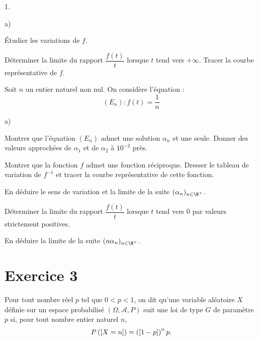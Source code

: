\documentclass[11pt]{article}%
\begin{document}
\begin{noliste}{1.}
 \setlength{\itemsep}{4mm}
\item 

\begin{noliste}{a)}
 \setlength{\itemsep}{2mm}
\item Étudier les variations de $f$.

\item Déterminer la limite du rapport $\dfrac{f(t)}{t}$ lorsque $t$
tend
vers $ + \infty $. Tracer la courbe représentative de $f$.
\end{noliste}

\item Soit $n$ un entier naturel non nul. On considère l'équation : 
\[
(E_{n}) :f(t) = \frac{1}{n}
\]

\begin{noliste}{a)}
 \setlength{\itemsep}{2mm}
\item Montrer que l'équation $(E_{n})$ admet une solution $\alpha_{n}$
et
une seule. Donner des valeurs approchées de $\alpha_{1}$ et de
$\alpha_{2}$
à $10^{-2}$ près.

\item Montrer que la fonction $f$ admet une fonction réciproque.
Dresser le
tableau de variation de $f^{-1}$ et tracer la courbe représentative de
cette
fonction.

En déduire le sens de variation et la limite de la suite $(\alpha
_{n})_{n\in \N^{\times }}$.

\item Déterminer la limite du rapport $\dfrac{f(t)}{t}$ lorsque $t$
tend
vers $0$ par valeurs strictement positives.

En déduire la limite de la suite $(n\alpha_{n})_{n\in \N^{\times }}$.
\end{noliste}
\end{noliste}

\section*{Exercice 3}

Pour tout nombre réel $p$ tel que $0<p<1$, on dit qu'une variable
aléatoire $X$ définie sur un espace probabilisé
$\left(\Omega,\mathcal{A},P\right)$ suit une loi de type $G$ de
paramètre $p$ si, pour tout
nombre entier naturel $n$, 
\[
P\left(\left[ {X = n} \right]\right) = \left(\left[ {1-p} \right]\right)^{n}p.
\]
\end{document}
